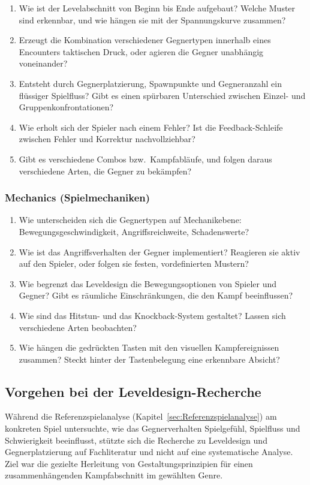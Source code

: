 \documentclass[../Main.tex]{subfiles}
\begin{document}
\begin{enumerate}[label=\textbf{D\arabic*}, leftmargin=1.5cm, itemsep=0.5em]
    \item Wie ist der Levelabschnitt von Beginn bis Ende aufgebaut? Welche Muster sind erkennbar, und wie hängen sie mit der Spannungskurve zusammen?
    \item Erzeugt die Kombination verschiedener Gegnertypen innerhalb eines Encounters taktischen Druck, oder agieren die Gegner unabhängig voneinander?
    \item Entsteht durch Gegnerplatzierung, Spawnpunkte und Gegneranzahl ein flüssiger Spielfluss? Gibt es einen spürbaren Unterschied zwischen Einzel- und Gruppenkonfrontationen?
    \item Wie erholt sich der Spieler nach einem Fehler? Ist die Feedback-Schleife zwischen Fehler und Korrektur nachvollziehbar?
    \item Gibt es verschiedene Combos bzw.\ Kampfabläufe, und folgen daraus verschiedene Arten, die Gegner zu bekämpfen?
\end{enumerate}

\subsubsection{Mechanics (Spielmechaniken)}

\begin{enumerate}[label=\textbf{M\arabic*}, leftmargin=1.5cm, itemsep=0.5em]
    \item Wie unterscheiden sich die Gegnertypen auf Mechanikebene: Bewegungsgeschwindigkeit, Angriffsreichweite, Schadenswerte?
    \item Wie ist das Angriffsverhalten der Gegner implementiert? Reagieren sie aktiv auf den Spieler, oder folgen sie festen, vordefinierten Mustern?
    \item Wie begrenzt das Leveldesign die Bewegungsoptionen von Spieler und Gegner? Gibt es räumliche Einschränkungen, die den Kampf beeinflussen?
    \item Wie sind das Hitstun- und das Knockback-System gestaltet? Lassen sich verschiedene Arten beobachten?
    \item Wie hängen die gedrückten Tasten mit den visuellen Kampfereignissen zusammen? Steckt hinter der Tastenbelegung eine erkennbare Absicht?
\end{enumerate}

\subsection{Vorgehen bei der Leveldesign-Recherche} \label{sec:VorgehenLeveldesign}
Während die Referenzspielanalyse (Kapitel~\ref{sec:Referenzspielanalyse}) am konkreten Spiel untersuchte, wie das Gegnerverhalten Spielgefühl, Spielfluss und Schwierigkeit beeinflusst, stützte sich die Recherche zu Leveldesign und Gegnerplatzierung auf Fachliteratur und nicht auf eine systematische Analyse. Ziel war die gezielte Herleitung von Gestaltungsprinzipien für einen zusammenhängenden Kampfabschnitt im gewählten Genre.
\end{document}
